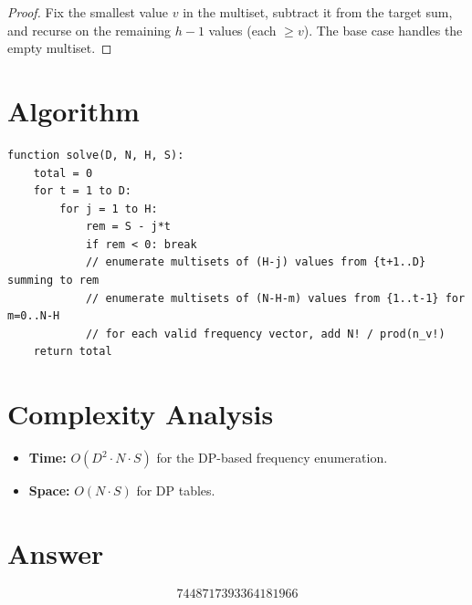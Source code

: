 \documentclass[12pt]{article}
\begin{document}
\begin{proof}
Fix the smallest value $v$ in the multiset, subtract it from the target sum, and recurse on the remaining $h{-}1$ values (each $\geq v$). The base case handles the empty multiset.
\end{proof}

\section{Algorithm}

\begin{verbatim}
function solve(D, N, H, S):
    total = 0
    for t = 1 to D:
        for j = 1 to H:
            rem = S - j*t
            if rem < 0: break
            // enumerate multisets of (H-j) values from {t+1..D} summing to rem
            // enumerate multisets of (N-H-m) values from {1..t-1} for m=0..N-H
            // for each valid frequency vector, add N! / prod(n_v!)
    return total
\end{verbatim}

\section{Complexity Analysis}
\begin{itemize}
    \item \textbf{Time:} $O(D^2 \cdot N \cdot S)$ for the DP-based frequency enumeration.
    \item \textbf{Space:} $O(N \cdot S)$ for DP tables.
\end{itemize}

\section{Answer}

\[
\boxed{7448717393364181966}
\]
\end{document}

